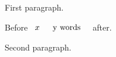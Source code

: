 \documentclass{article}
\begin{document}
First paragraph.

Before $\begin{array}{ll} x & \mbox{\begin{tabular}{l} y words \lxmbf\end{tabular}}\end{array}$ after.

Second paragraph.
\end{document}

